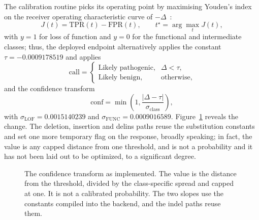 \documentclass[10pt,journal]{IEEEtran}
\begin{document}
The calibration routine picks its operating point by maximising Youden's index on the receiver operating characteristic curve of $-\Delta$~\cite{hanley1982roc,youden1950index}:
\begin{equation}
J(t)=\mathrm{TPR}(t)-\mathrm{FPR}(t), \qquad t^{\star}=\arg\max_t J(t),
\label{eq:youden}
\end{equation}
with $y=1$ for loss of function and $y=0$ for the functional and intermediate classes; thus, the deployed endpoint alternatively applies the constant $\tau=-0.0009178519$ and applies
\begin{equation}
\mathrm{call}=\begin{cases}
\text{Likely pathogenic}, & \Delta < \tau,\\
\text{Likely benign}, & \text{otherwise},
\end{cases}
\label{eq:call}
\end{equation}
and the confidence transform
\begin{equation}
\mathrm{conf}=\min\!\left(1,\frac{|\Delta-\tau|}{\sigma_{\mathrm{class}}}\right),
\label{eq:conf}
\end{equation}
with $\sigma_{\mathrm{LOF}}=0.0015140239$ and $\sigma_{\mathrm{FUNC}}=0.0009016589$. Figure~\ref{fig:conf} reveals the change. The deletion, insertion and delins paths reuse the substitution constants and set one more temporary flag on the response, broadly speaking; in fact, the value is any capped distance from one threshold, and is not a probability and it has not been laid out to be optimized, to a significant degree.

\begin{figure}[!t]
\centering
{}
\caption{The confidence transform as implemented. The value is the distance from the threshold, divided by the class-specific spread and capped at one. It is not a calibrated probability. The two slopes use the constants compiled into the backend, and the indel paths reuse them.}
\label{fig:conf}
\end{figure}
\end{document}
